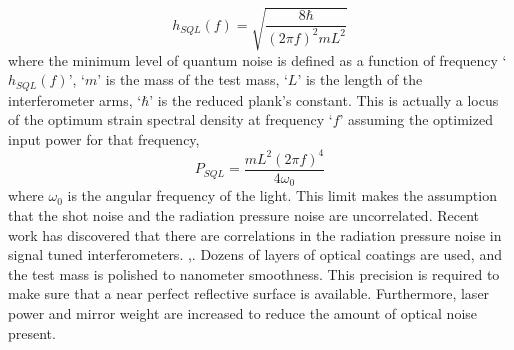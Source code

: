 \begin{equation}
    h_{SQL}(f) = \sqrt{\frac{8\hbar}{(2\pi f)^2 mL^2}} 
\end{equation}
where the minimum level of quantum noise is defined as a function of frequency `$h_{SQL}(f)$', `$m$' is  the mass of the test mass, `$L$' is the length of the interferometer arms, `$\hbar$' is the reduced plank's constant. This is actually a locus of the optimum strain spectral density at frequency `$f$' assuming the optimized input power for that frequency,
\begin{equation}
    P_{SQL} = \frac{mL^2(2\pi f)^4}{4\omega_0}
\end{equation}
where $\omega_0$ is the angular frequency of the light. This limit makes the assumption that the shot noise and the radiation pressure noise are uncorrelated. Recent work has discovered that there are correlations in the radiation pressure noise in signal tuned interferometers. \cite{buonanno18optical},\cite{buonanno2001quantum}. Dozens of layers of optical coatings are used, and the test mass is polished to nanometer smoothness. This precision is required to make sure that a near perfect reflective surface is available. Furthermore, laser power and mirror weight are increased to reduce the amount of optical noise present.
